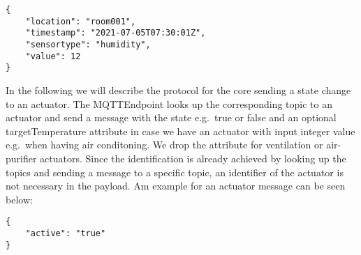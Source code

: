 \begin{verbatim}
{
    "location": "room001",
    "timestamp": "2021-07-05T07:30:01Z",
    "sensortype": "humidity",
    "value": 12
}
\end{verbatim}

In the following we will describe the protocol for the core sending a
state change to an actuator.
The MQTTEndpoint looks up the corresponding
topic to an actuator and send a message with the state e.g.~true or
false and an optional targetTemperature attribute in case we have an
actuator with input integer value e.g.~when having air conditoning.
We
drop the attribute for ventilation or air-purifier actuators.
Since the
identification is already achieved by looking up the topics and sending
a message to a specific topic, an identifier of the actuator is not
necessary in the payload.
Am example for an actuator message can be seen below:

\begin{verbatim}
{
    "active": "true"
}
\end{verbatim}
